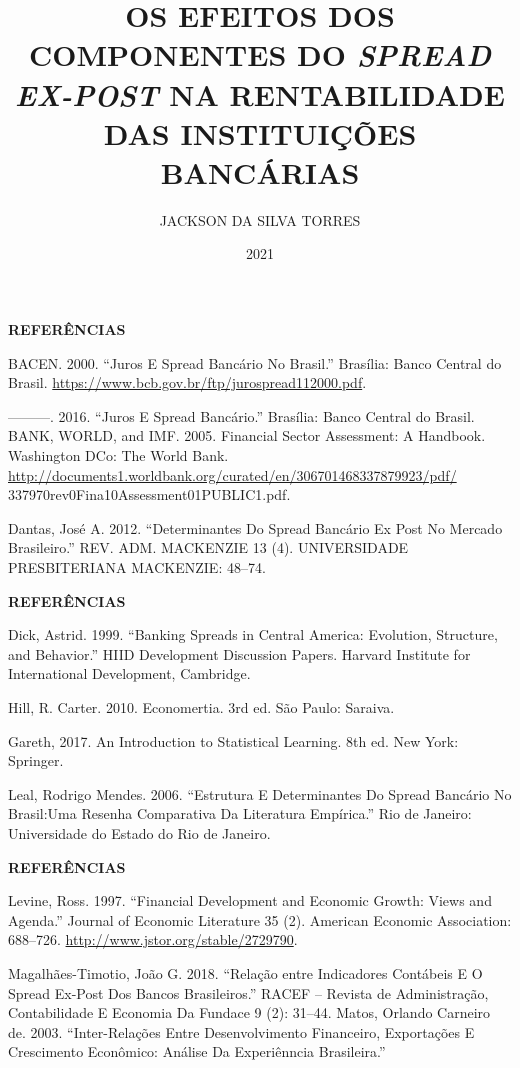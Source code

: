 \documentclass[ignorenonframetext,aspectratio=169,ignorenonframetext]{beamer}
\title{OS EFEITOS DOS COMPONENTES DO \emph{SPREAD} \emph{EX-POST} NA
RENTABILIDADE DAS INSTITUIÇÕES BANCÁRIAS}
\author{JACKSON DA SILVA TORRES}
\date{2021}
\begin{document}
\frame{\titlepage}

\begin{frame}{\textbf{REFERÊNCIAS}}
\protect\hypertarget{referuxeancias}{}

BACEN. 2000. ``Juros E Spread Bancário No Brasil.'' Brasília: Banco
Central do Brasil.
\url{https://www.bcb.gov.br/ftp/jurospread112000.pdf}.

---------. 2016. ``Juros E Spread Bancário.'' Brasília: Banco Central do
Brasil. BANK, WORLD, and IMF. 2005. Financial Sector Assessment: A
Handbook. Washington DCo: The World Bank.
\url{http://documents1.worldbank.org/curated/en/306701468337879923/pdf/}
337970rev0Fina10Assessment01PUBLIC1.pdf.

Dantas, José A. 2012. ``Determinantes Do Spread Bancário Ex Post No
Mercado Brasileiro.'' REV. ADM. MACKENZIE 13 (4). UNIVERSIDADE
PRESBITERIANA MACKENZIE: 48--74.

\end{frame}

\begin{frame}{\textbf{REFERÊNCIAS}}
\protect\hypertarget{referuxeancias-1}{}

Dick, Astrid. 1999. ``Banking Spreads in Central America: Evolution,
Structure, and Behavior.'' HIID Development Discussion Papers. Harvard
Institute for International Development, Cambridge.

Hill, R. Carter. 2010. Economertia. 3rd ed. São Paulo: Saraiva.

Gareth, 2017. An Introduction to Statistical Learning. 8th ed. New York:
Springer.

Leal, Rodrigo Mendes. 2006. ``Estrutura E Determinantes Do Spread
Bancário No Brasil:Uma Resenha Comparativa Da Literatura Empírica.'' Rio
de Janeiro: Universidade do Estado do Rio de Janeiro.

\end{frame}

\begin{frame}{\textbf{REFERÊNCIAS}}
\protect\hypertarget{referuxeancias-2}{}

Levine, Ross. 1997. ``Financial Development and Economic Growth: Views
and Agenda.'' Journal of Economic Literature 35 (2). American Economic
Association: 688--726. \url{http://www.jstor.org/stable/2729790}.

Magalhães-Timotio, João G. 2018. ``Relação entre Indicadores Contábeis E
O Spread Ex-Post Dos Bancos Brasileiros.'' RACEF -- Revista de
Administração, Contabilidade E Economia Da Fundace 9 (2): 31--44. Matos,
Orlando Carneiro de. 2003. ``Inter-Relações Entre Desenvolvimento
Financeiro, Exportações E Crescimento Econômico: Análise Da Experiênncia
Brasileira.''

\end{frame}
\end{document}
